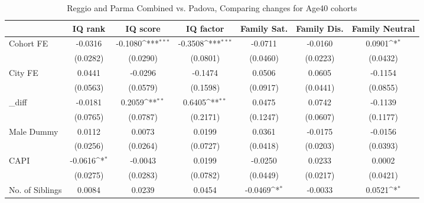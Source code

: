\begin{table}[htbp]\centering
\def\sym#1{\ifmmode^{#1}\else\(^{#1}\)\fi}
\caption{Reggio and Parma Combined vs. Padova, Comparing changes for Age40 cohorts}
\begin{tabular}{l*{6}{c}}
\toprule
            &\multicolumn{1}{c}{IQ rank}&\multicolumn{1}{c}{IQ score}&\multicolumn{1}{c}{IQ factor}&\multicolumn{1}{c}{Family Sat.}&\multicolumn{1}{c}{Family Dis.}&\multicolumn{1}{c}{Family Neutral}\\
\midrule
Cohort FE   &     -0.0316         &     -0.1080\sym{***}&     -0.3508\sym{***}&     -0.0711         &     -0.0160         &      0.0901\sym{*}  \\
            &    (0.0282)         &    (0.0290)         &    (0.0801)         &    (0.0460)         &    (0.0223)         &    (0.0432)         \\
\addlinespace
City FE     &      0.0441         &     -0.0296         &     -0.1474         &      0.0506         &      0.0605         &     -0.1154         \\
            &    (0.0563)         &    (0.0579)         &    (0.1598)         &    (0.0917)         &    (0.0441)         &    (0.0855)         \\
\addlinespace
\_diff       &     -0.0181         &      0.2059\sym{**} &      0.6405\sym{**} &      0.0475         &      0.0742         &     -0.1139         \\
            &    (0.0765)         &    (0.0787)         &    (0.2171)         &    (0.1247)         &    (0.0607)         &    (0.1177)         \\
\addlinespace
Male Dummy  &      0.0112         &      0.0073         &      0.0199         &      0.0361         &     -0.0175         &     -0.0156         \\
            &    (0.0256)         &    (0.0264)         &    (0.0727)         &    (0.0418)         &    (0.0203)         &    (0.0393)         \\
\addlinespace
CAPI        &     -0.0616\sym{*}  &     -0.0043         &      0.0199         &     -0.0250         &      0.0233         &      0.0002         \\
            &    (0.0275)         &    (0.0283)         &    (0.0782)         &    (0.0449)         &    (0.0217)         &    (0.0421)         \\
\addlinespace
No. of Siblings&      0.0084         &      0.0239         &      0.0454         &     -0.0469\sym{*}  &     -0.0033         &      0.0521\sym{*}  \\

\end{tabular}
\end{table}
